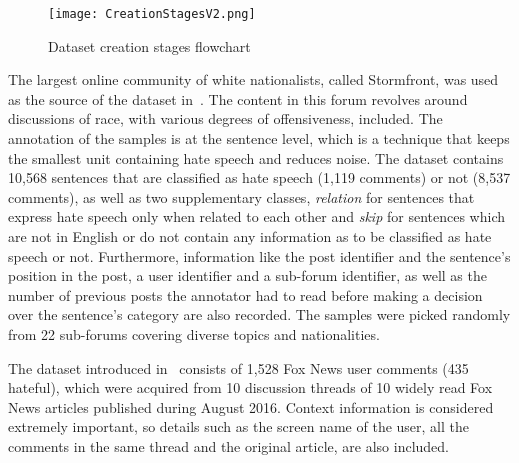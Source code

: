 \documentclass[sigconf]{acmart}
\begin{document}
\begin{figure*}[!t]
    \centering
    \texttt{[image: CreationStagesV2.png]}
    \caption{Dataset creation stages flowchart}
    \label{fig:dcreation}
\end{figure*}

The largest online community of white nationalists, called Stormfront, was used as the source of the dataset in~\cite{whitesupremacist}. The content in this forum revolves around discussions of race, with various degrees of offensiveness, included. The annotation of the samples is at the sentence level, which is a technique that keeps the smallest unit containing hate speech and reduces noise. The dataset
contains 10,568 sentences that are classified as hate speech (1,119 comments) or not (8,537 comments), as well as two supplementary classes, {\em relation} for sentences that express hate speech only when related to each other and {\em skip} for sentences which are not in English or do not contain any information as to be classified as hate speech or not. Furthermore, information like the post identifier and the sentence’s position in the post, a user identifier and a sub-forum identifier, as well as the number of previous posts the annotator had to read before making a decision over the sentence’s category are also recorded. The samples were picked randomly from 22 sub-forums covering diverse topics and nationalities.

The dataset introduced in~\cite{foxnews} consists of 1,528 Fox News user comments (435 hateful), which were acquired from 10 discussion threads of 10 widely read Fox News articles published during August 2016. Context information is considered extremely important, so details such as the screen name of the user, all the comments in the same thread and the original article, are also included.
\end{document}

